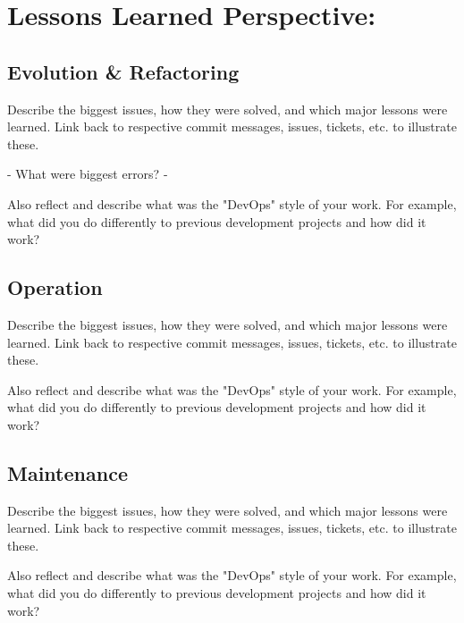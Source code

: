 \section{Lessons Learned Perspective:}

\subsection{Evolution \& Refactoring}
Describe the biggest issues, how they were solved, and which major lessons were learned. Link back to respective commit messages, issues, tickets, etc. to illustrate these.

- What were biggest errors?
- 

Also reflect and describe what was the "DevOps" style of your work. For example, what did you do differently to previous development projects and how did it work?

\subsection{Operation}
Describe the biggest issues, how they were solved, and which major lessons were learned. Link back to respective commit messages, issues, tickets, etc. to illustrate these.

Also reflect and describe what was the "DevOps" style of your work. For example, what did you do differently to previous development projects and how did it work?

\subsection{Maintenance}
Describe the biggest issues, how they were solved, and which major lessons were learned. Link back to respective commit messages, issues, tickets, etc. to illustrate these.

Also reflect and describe what was the "DevOps" style of your work. For example, what did you do differently to previous development projects and how did it work?